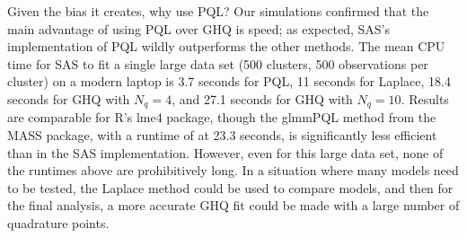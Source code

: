 \documentclass{article}
\begin{document}
\begin{flushleft}
Given the bias it creates, why use PQL? Our simulations confirmed that the main advantage of using PQL over GHQ is speed; as expected, SAS's implementation of PQL wildly outperforms the other methods. The mean CPU time for SAS to fit a single large data set (500 clusters, 500 observations per cluster) on a modern laptop is 3.7 seconds for PQL, 11 seconds for Laplace, 18.4 seconds for GHQ with $N_q=4$, and 27.1 seconds for GHQ with $N_q=10$. Results are comparable for R's lme4 package, though the glmmPQL method from the MASS package, with a runtime of at 23.3 seconds, is significantly less efficient than in the SAS implementation. However, even for this large data set, none of the runtimes above are prohibitively long. In a situation where many models need to be tested, the Laplace method could be used to compare models, and then for the final analysis, a more accurate GHQ fit could be made with a large number of quadrature points.



\end{flushleft}
\end{document}
